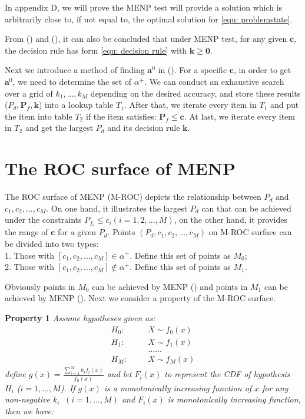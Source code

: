 \documentclass[12pt,journal,a4paper,twoside,onecolumn]{IEEEtran}
\newcommand{\rmnum}[1]{\romannumeral #1}
\begin{document}
\begin{spacing}{2.5}
In appendix D, we will prove the MENP test will provide a solution which is arbitrarily close to, if not equal to, the optimal solution for \eqref{equ: problemstate}.

From (\rmnum{1}) and (\rmnum{2}), it can also be concluded that under MENP test, for any given $\mathbf{c}$, the decision rule has form  \eqref{equ: decision rule} with $\mathbf{k} \geq \mathbf{0}$.

Next we introduce a method of finding $\mathbf{a}^0$ in (\rmnum{2}). For a specific $\mathbf{c}$, in order to get $\mathbf{a}^0$, we need to determine the set of $\alpha^+$. We can conduct an exhaustive search over a grid of $k_1, ..., k_M$ depending on the desired accuracy, and store these results ($P_d, \mathbf{P}_f, \mathbf{k}$) into a lookup table $T_1$. After that, we iterate every item in $T_1$ and put the item into table $T_2$ if the item satisfies:  $\mathbf{P}_f \leq \mathbf{c}$.
At last, we iterate every item in $T_2$ and get the largest $P_d$ and its decision rule $\mathbf{k}$.

\section{The ROC surface of MENP}

The ROC surface of MENP (M-ROC) depicts the relationship between $P_d$ and $c_1, c_2, ..., c_M$. On one hand, it  illustrates the largest $P_d$ can that can be achieved under the constraints $P_{f_i} \leq c_i (i = 1, 2, ..., M)$, on the other hand, it provides the range of $\mathbf{c}$ for a given $P_d$.
Points $(P_d, c_1, c_2, ..., c_M)$ on M-ROC  surface can be divided into two types: 
\\1. Those with $[c_1, c_2, ..., c_M] \in \alpha^+$. Define this set of points as $M_0$; 
\\2. Those with $[c_1, c_2, ..., c_M] \notin \alpha^+$. Define this set of points as $M_1$. 

Obviously points in $M_0$ can be achieved by MENP (\rmnum{1}) and points in $M_1$ can  be achieved by MENP (\rmnum{2}). Next we consider a property of the M-ROC surface.

\noindent \textbf{Property 1}
\noindent \textit{
  \noindent Assume hypotheses given as:
}
\begin{equation}
\begin{split}
H_0:\;\;\;\;\;\;&X \sim f_0(x)\\
H_1:\;\;\;\;\;\;&X \sim f_1(x)\\
  &......\\
H_M:\;\;\;\;\;\;&X \sim f_M(x)
\end{split}
\end{equation}
\textit{
  define $g(x) = \frac{\sum_{i=1}^{M}k_if_i(x)}{f_0(x)}$ and let $F_i(x)$ to represent the CDF of hypothesis $H_i$ ($i = 1, ..., M$). If $g(x)$ is a monotonically increasing function of $x$ for any non-negative $k_i\;\;(i = 1, ..., M)$ and $F_i(x)$ is monotonically increasing function, then we have:}
  

\end{spacing}
\end{document}

